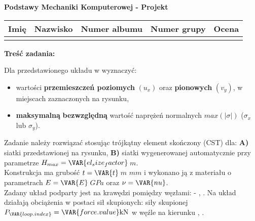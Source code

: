 \documentclass[a4paper,10pt]{article}
\begin{document}
\begin{center}
    {\Large \textbf{Podstawy Mechaniki Komputerowej - Projekt}}
    \end{center}

    \begin{table}[ht]
        \centering
        \begin{tabular}{
            m{}m{}m{}m{}m{}}
        \toprule
        Imię & Nazwisko & Numer albumu & Numer grupy  & Ocena \\ \midrule
             &          &              &              &       \\ \bottomrule
        \end{tabular}
        \label{tab:dane_studenta}
    \end{table}

    \noindent\textbf{Treść zadania:} \vspace{1mm}

    \noindent Dla przedstawionego układu w \textbf{} wyznaczyć:
    \begin{itemize}
        \item wartości \textbf{przemieszczeń poziomych} $(u_x)$ oraz \textbf{pionowych} $(v_y)$, w miejscach zaznaczonych na rysunku,
        \item \textbf{maksymalną} \textbf{bezwzględną} wartość naprężeń normalnych $max(|\sigma|)$ ($\sigma_x$ lub $\sigma_y$).
    \end{itemize}

    \noindent Zadanie należy rozwiązać stosując trójkątny element skończony (CST) dla: \textbf{A)} siatki przedstawionej na rysunku, \textbf{B)} siatki wygenerowanej automatycznie przy parametrze $H_{max} = \VAR{el_size_factor}$\,$\si{m}$. \\
    Konstrukcja ma grubość $t = \VAR{t}$\,$\si{m}$  $\si{mm}$  i wykonano ją z materiału o parametrach $E = \VAR{E}$\,$\si{GPa}$ oraz $\nu = \VAR{nu}$. \\
    Zadany układ podparty jest na krawędzi pomiędzy węzłami:
         -  %
        , 
    . 
    Na układ działają obciążenia w postaci 
             sił skupionych: 
             siły skupionej
        $P_\VAR{loop.index} = \VAR{force.value}\si{kN}$ w węźle  na kierunku %
        , 
    . \newline
\end{document}
